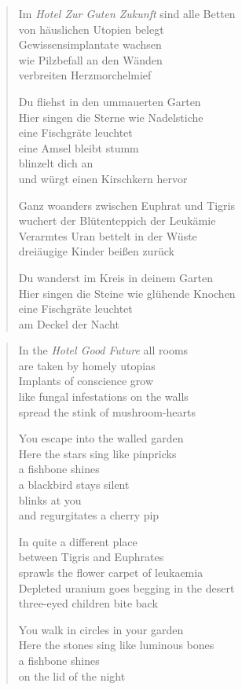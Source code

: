 
\cleartorecto


\begin{verse}
Im \emph{Hotel Zur Guten Zukunft} sind alle Betten\\
von häuslichen Utopien belegt\\
Gewissensimplantate wachsen\\
wie Pilzbefall an den Wänden\\
verbreiten Herzmorchelmief

Du fliehst in den ummauerten Garten\\
Hier singen die Sterne wie Nadelstiche\\
eine Fischgräte leuchtet\\
eine Amsel bleibt stumm\\
blinzelt dich an\\
und würgt einen Kirschkern hervor

Ganz woanders zwischen Euphrat und Tigris\\
wuchert der Blütenteppich der Leukämie\\
Verarmtes Uran bettelt in der Wüste\\
dreiäugige Kinder beißen zurück

Du wanderst im Kreis in deinem Garten\\
Hier singen die Steine wie glühende Knochen\\
eine Fischgräte leuchtet\\
am Deckel der Nacht
\end{verse}

\cleartoverso


\begin{verse}
In the \emph{Hotel Good Future} all rooms\\
are taken by homely utopias\\
Implants of conscience grow\\
like fungal infestations on the walls\\
spread the stink of mushroom-hearts

You escape into the walled garden\\
Here the stars sing like pinpricks\\
a fishbone shines\\
a blackbird stays silent\\
blinks at you\\
and regurgitates a cherry pip

In quite a different place\\
between Tigris and Euphrates\\
sprawls the flower carpet of leukaemia\\
Depleted uranium goes begging in the desert\\
three-eyed children bite back

You walk in circles in your garden\\
Here the stones sing like luminous bones\\
a fishbone shines\\
on the lid of the night
\end{verse}
